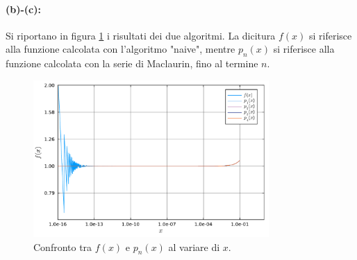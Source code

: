 \documentclass[letterpaper, 12pt]{article}
\begin{document}
\paragraph{(b)-(c): } Si riportano in figura \ref{fig:es1_4_2_1} i risultati dei due algoritmi. La dicitura $f(x)$ 
si riferisce alla funzione calcolata con l'algoritmo "naive", mentre $p_n(x)$ si riferisce alla funzione calcolata 
con la serie di Maclaurin, fino al termine $n$.

\begin{figure}[ht!]
    \centering
    \includegraphics[width=0.8\textwidth]{1421.pdf}
    \caption{Confronto tra $f(x)$ e $p_n(x)$ al variare di $x$.}
    \label{fig:es1_4_2_1}
\end{figure}
\end{document}

